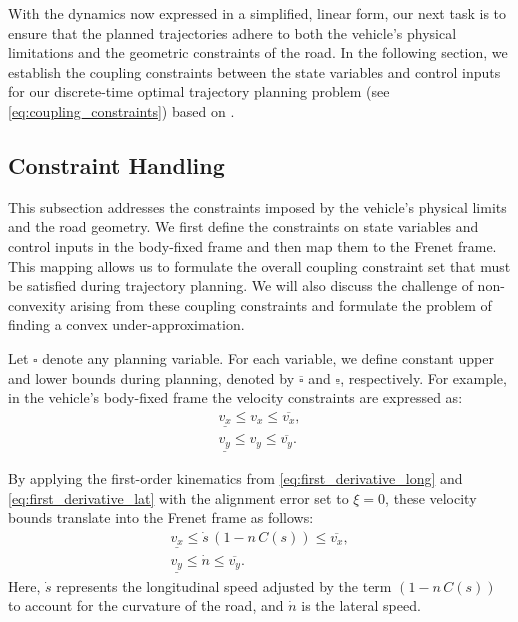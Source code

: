 With the dynamics now expressed in a simplified, linear form, our next task is to ensure that the planned trajectories adhere to both the vehicle's
physical limitations and the geometric constraints of the road.
In the following section, we establish the coupling constraints between the state variables and control inputs for our discrete-time optimal
trajectory planning problem (see \eqref{eq:coupling_constraints}) based on \cite{eilbrecht_challenges_2020}.

\subsection{Constraint Handling}

This subsection addresses the constraints imposed by the vehicle's physical limits and the road geometry.
We first define the constraints on state variables and control inputs in the body-fixed frame and then map them to the Frenet frame.
This mapping allows us to formulate the overall coupling constraint set that must be satisfied during trajectory planning.
We will also discuss the challenge of non-convexity arising from these coupling constraints and formulate the problem of finding a convex
under-approximation.

Let \(\square\) denote any planning variable.
For each variable, we define constant upper and lower bounds during planning, denoted by \(\overline{\square}\) and \(\underline{\square}\),
respectively.
For example, in the vehicle's body-fixed frame the velocity constraints are expressed as:
\begin{align}
	\underline{v_x} \leq v_x \leq \overline{v_x}, \\
	\underline{v_y} \leq v_y \leq \overline{v_y}.
\end{align}

By applying the first-order kinematics from \eqref{eq:first_derivative_long} and \eqref{eq:first_derivative_lat} with the alignment error set to \(\xi=0\), these velocity bounds translate into the Frenet frame as follows:
\begin{align}
	\underline{v_x} \leq \dot{s}\,(1 - n\,C(s)) \leq \overline{v_x}, \\
	\underline{v_y} \leq \dot{n} \leq \overline{v_y}.
\end{align}
Here, \(\dot{s}\) represents the longitudinal speed adjusted by the term \((1 - n\,C(s))\) to account for the curvature of the road, and \(\dot{n}\)
is the lateral speed.

